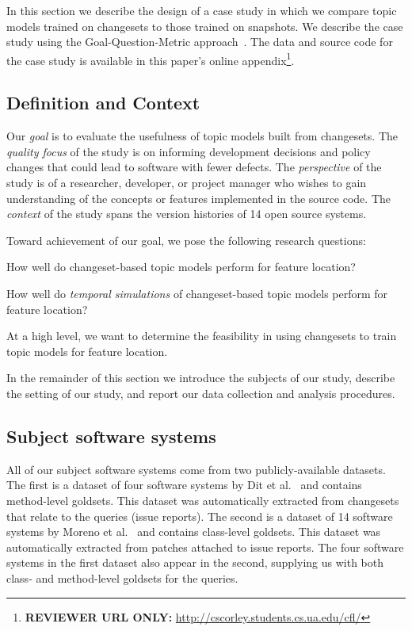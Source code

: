 
In this section we describe the design of a case study in which we
compare topic models trained on changesets to those trained on snapshots.
We describe the case study using the Goal-Question-Metric approach~\cite{Basili-etal:94}.
The data and source code for the case study is available in this paper's online
appendix\footnote{\textbf{REVIEWER URL ONLY:} \url{http://cscorley.students.cs.ua.edu/cfl/}}.

\subsection{Definition and Context}

Our \textit{goal} is to evaluate the usefulness of topic models built
from changesets.
The \textit{quality focus} of the study is on informing development
decisions and policy changes that could lead to software with fewer
defects.
The \textit{perspective} of the study is of a researcher, developer, or
project manager who wishes to gain understanding of the concepts or
features implemented in the source code.
The \textit{context} of the study spans the version histories of 14
open source systems.

Toward achievement of our goal, we pose the following research questions:
\begin{description}[font=\itshape\mdseries,leftmargin=10mm,style=sameline]
    \item[RQ1] How well do changeset-based topic models perform for feature location?
    \item[RQ2] How well do \emph{temporal simulations} of changeset-based topic models perform for feature location?
\end{description}
At a high level, we want to determine the feasibility in using changesets
to train topic models for feature location.

In the remainder of this section we introduce the subjects of our study,
describe the setting of our study, and report our data collection and analysis procedures.


\subsection{Subject software systems}

All of our subject software systems come from two publicly-available
datasets.
The first is a dataset of four software systems by Dit et al.~\cite{Dit-etal:2013} and contains method-level goldsets.
This dataset was automatically extracted from changesets that relate to the queries (issue reports).
The second is a dataset of 14 software systems by Moreno et al.~\cite{Moreno-etal:2014} and contains class-level goldsets.
This dataset was automatically extracted from patches attached to issue reports.
The four software systems in the first dataset also appear in the second,
supplying us with both class- and method-level goldsets for the queries.

